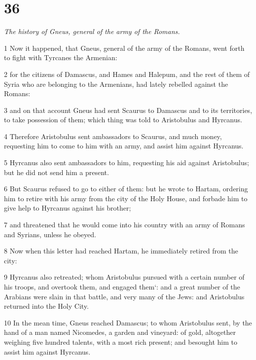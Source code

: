 \chapter{36}

\par \textit{The history of Gneus, general of the army of the Romans.}

\par 1 Now it happened, that Gneus, general of the army of the Romans, went forth to fight with Tyrcanes the Armenian: 

\par 2 for the citizens of Damascus, and Hames and Halepum, and the rest of them of Syria who are belonging to the Armenians, had lately rebelled against the Romans: 

\par 3 and on that account Gneus had sent Scaurus to Damascus and to its territories, to take possession of them; which thing was told to Aristobulus and Hyrcanus. 

\par 4 Therefore Aristobulus sent ambassadors to Scaurus, and much money, requesting him to come to him with an army, and assist him against Hyrcanus. 

\par 5 Hyrcanus also sent ambassadors to him, requesting his aid against Aristobulus; but he did not send him a present. 

\par 6 But Scaurus refused to go to either of them: but he wrote to Hartam, ordering him to retire with his army from the city of the Holy House, and forbade him to give help to Hyrcanus against his brother; 

\par 7 and threatened that he would come into his country with an army of Romans and Syrians, unless he obeyed. 

\par 8 Now when this letter had reached Hartam, he immediately retired from the city: 

\par 9 Hyrcanus also retreated; whom Aristobulus pursued with a certain number of his troops, and overtook them, and engaged them‘: and a great number of the Arabians were slain in that battle, and very many of the Jews: and Aristobulus returned into the Holy City.

\par 10 In the mean time, Gneus reached Damascus; to whom Aristobulus sent, by the hand of a man named Nicomedes, a garden and vineyard: of gold, altogether weighing five hundred talents, with a most rich present; and besought him to assist him against Hyrcanus. 

